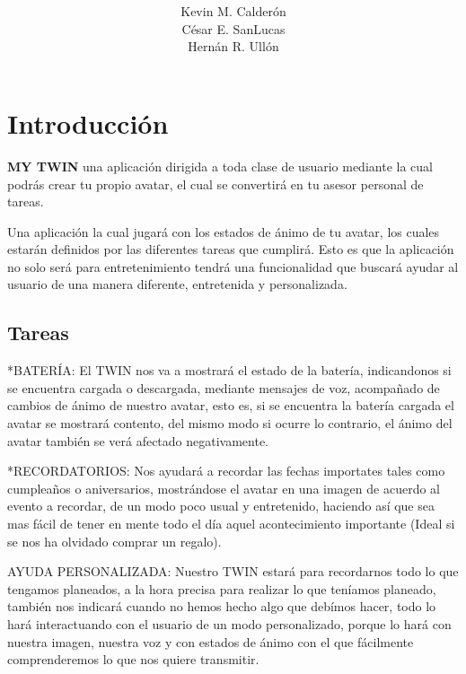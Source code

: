 \documentclass[12pt]{article}
\title{{\LARGE \textbf{\color{blue}{MY TWIN}}}}
\author{Kevin M. Calder\'on\\C\'esar E. SanLucas\\Hern\'an R. Ull\'on}
\date{}
\begin{document}
\maketitle


\newpage
\section{Introducci\'on} 

\textbf{MY TWIN} una aplicaci\'on dirigida a toda clase de usuario mediante la cual podr\'as crear tu propio avatar, el cual se convertir\'a en tu asesor personal de tareas. 

Una aplicaci\'on la cual jugar\'a con los estados de \'animo de tu avatar, los cuales estar\'an definidos por las diferentes tareas que cumplir\'a. Esto es que la aplicaci\'on no solo ser\'a para entretenimiento tendr\'a una funcionalidad que buscar\'a ayudar al usuario de una manera diferente, entretenida y personalizada.\\
\subsection{Tareas} 

\hspace{0.2in}*BATER\'IA: El TWIN  nos va a mostrar\'a el estado de la bater\'ia, indicandonos si se encuentra cargada o descargada, mediante mensajes de voz, acompa\~nado de cambios de \'animo de nuestro avatar, esto es, si se encuentra la bater\'ia cargada el avatar se mostrar\'a contento, del mismo modo si ocurre lo contrario, el \'animo del avatar tambi\'en se ver\'a afectado negativamente. 

\hspace{0.2in}*RECORDATORIOS: Nos ayudar\'a a recordar las fechas importates tales como cumplea\~nos o aniversarios, mostr\'andose el avatar en una imagen de acuerdo al evento a recordar, de un modo poco usual y entretenido, haciendo as\'i que sea mas f\'acil de tener en mente todo el d\'ia aquel acontecimiento importante (Ideal si se nos ha olvidado comprar un regalo). 

\hspace{0.2in}AYUDA PERSONALIZADA: Nuestro TWIN estar\'a para recordarnos todo lo que tengamos planeados, a la hora precisa para realizar lo que ten\'iamos planeado, tambi\'en nos indicar\'a cuando no hemos hecho algo que deb\'imos hacer, todo lo har\'a interactuando con el usuario de un modo personalizado, porque lo har\'a con nuestra imagen, nuestra voz y con estados de \'animo con el que f\'acilmente comprenderemos lo que nos quiere transmitir.
\end{document}
